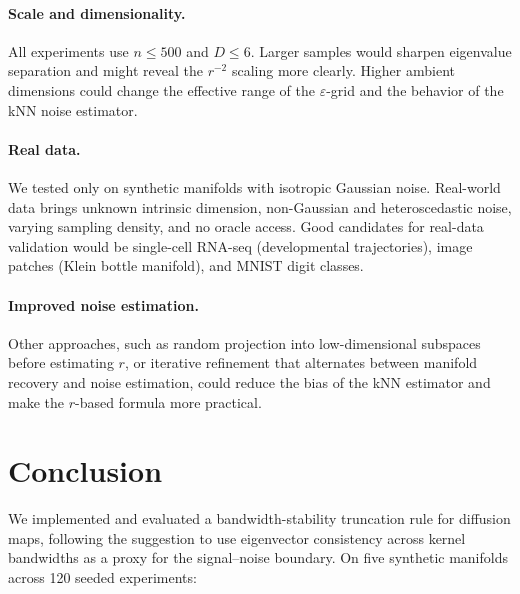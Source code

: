 \documentclass{article}
\begin{document}
\paragraph{Scale and dimensionality.} All experiments use $n \leq 500$ and $D \leq 6$. Larger samples would sharpen eigenvalue separation and might reveal the $r^{-2}$ scaling more clearly. Higher ambient dimensions could change the effective range of the $\varepsilon$-grid and the behavior of the kNN noise estimator.

\paragraph{Real data.} We tested only on synthetic manifolds with isotropic Gaussian noise. Real-world data brings unknown intrinsic dimension, non-Gaussian and heteroscedastic noise, varying sampling density, and no oracle access. Good candidates for real-data validation would be single-cell RNA-seq (developmental trajectories), image patches (Klein bottle manifold), and MNIST digit classes.

\paragraph{Improved noise estimation.} Other approaches, such as random projection into low-dimensional subspaces before estimating $r$, or iterative refinement that alternates between manifold recovery and noise estimation, could reduce the bias of the kNN estimator and make the $r$-based formula more practical.

\section{Conclusion}
\label{sec:conclusion}

We implemented and evaluated a bandwidth-stability truncation rule for diffusion maps, following the suggestion to use eigenvector consistency across kernel bandwidths as a proxy for the signal--noise boundary. On five synthetic manifolds across 120 seeded experiments:
\end{document}
